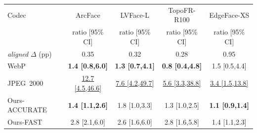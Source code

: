 \begin{tabular}{lcccc}
\toprule
Codec & ArcFace & LVFace-L & TopoFR-R100 & EdgeFace-XS \\
 & ratio [95\% CI] & ratio [95\% CI] & ratio [95\% CI] & ratio [95\% CI] \\
\midrule
\emph{aligned} $\Delta$ (pp) & 0.35 & 0.32 & 0.28 & 0.95 \\
\midrule
WebP & \cellcolor{green!25}\textbf{1.4 [0.8,6.0]} & \cellcolor{green!25}\textbf{1.3 [0.7,4.1]} & \cellcolor{green!25}\textbf{0.8 [0.4,4.8]} & 1.5 [0.5,4.4] \\
JPEG~2000 & \cellcolor{red!22}\underline{12.7 [4.5,46.6]} & \cellcolor{red!22}\underline{7.6 [4.2,49.7]} & \cellcolor{red!22}\underline{5.6 [3.3,38.8]} & \cellcolor{red!22}\underline{3.4 [1.5,13.8]} \\
Ours-ACCURATE & \cellcolor{green!25}\textbf{1.4 [1.1,2.6]} & 1.8 [1.0,3.3] & 1.3 [1.0,2.5] & \cellcolor{green!25}\textbf{1.1 [0.9,1.4]} \\
Ours-FAST & 2.8 [2.1,6.0] & 2.6 [1.6,6.0] & 2.8 [1.6,5.8] & 1.4 [1.1,2.3] \\
\bottomrule
\end{tabular}
